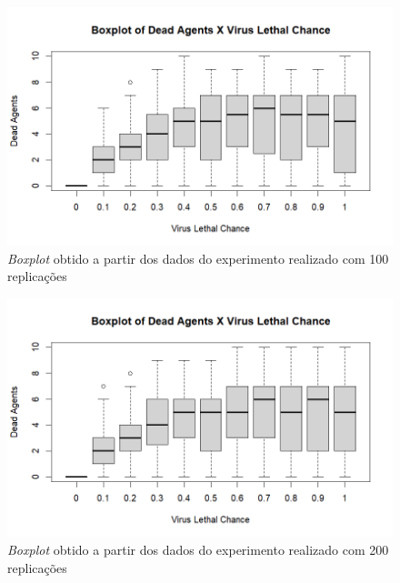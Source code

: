 \begin{figure}[H]
    \centering
    \includegraphics[angle=0,width=1\textwidth]{exploratory-data-analysis/seraphritt/PesqBibliogr/Virus-Network/Boxplot_100_repl.png}
    \caption{\textit{Boxplot} obtido a partir dos dados do experimento realizado com 100 replicações}
    \label{fig:seraphritt:bp2}
\end{figure}

\begin{figure}[H]
    \centering
    \includegraphics[angle=0,width=1\textwidth]{exploratory-data-analysis/seraphritt/PesqBibliogr/Virus-Network/Boxplot_200_repl.png}
    \caption{\textit{Boxplot} obtido a partir dos dados do experimento realizado com 200 replicações}
    \label{fig:seraphritt:bp3}
\end{figure}

